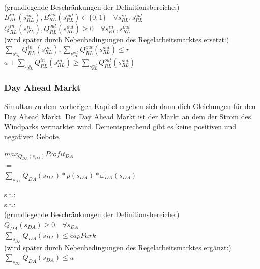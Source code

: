(grundlegende Beschränkungen der Definitionsbereiche:)\\
$B^{in}_{RL}(s^{in}_{RL}),B^{out}_{RL}(s^{out}_{RL}) \in \{0,1\}\quad\forall s^{in}_{RL},s^{out}_{RL} $\\
$Q^{in}_{RL}(s^{in}_{RL}),Q^{out}_{RL}(s^{out}_{RL}) \geq 0\quad\forall  s^{in}_{RL},s^{out}_{RL} $\\
(wird später durch Nebenbedingungen des Regelarbeitsmarktes ersetzt:)\\
$\sum_{s^{in}_{RL}}Q^{in}_{RL}(s^{in}_{RL}),\sum_{s^{out}_{RL}}Q^{out}_{RL}(s^{out}_{RL}) \leq r$\\
$a + \sum_{s^{in}_{RL}}Q^{in}_{RL}(s^{in}_{RL})\geq \sum_{s^{out}_{RL}}Q^{out}_{RL}(s^{out}_{RL}) $\\

\subsubsection{Day Ahead Markt}
Simultan zu dem vorherigen Kapitel ergeben sich dann dich Gleichungen für den Day Ahead Markt.
Der Day Ahead Markt ist der Markt an dem der Strom des Windparks vermarktet wird. Dementsprechend gibt es keine positiven und negativen Gebote.

\begin{center}
	$max_{Q_{DA}(s_{DA})} Profit_{DA}$\\
	$=$\\
	$\sum_{s_{DA}} Q_{DA}(s_{DA}) * p(s_{DA}) * \omega_{DA}(s_{DA})$\\

\end{center}
s.t.:\\

s.t.:\\
(grundlegende Beschränkungen der Definitionsbereiche:)\\
$Q_{DA}(s_{DA}) \geq 0\quad\forall  s_{DA} $\\
$ \sum_{s_{DA}}Q_{DA}(s_{DA}) \leq capPark $\\
(wird später durch Nebenbedingungen des Regelarbeitsmarktes ergänzt:)\\
$ \sum_{s_{DA}}Q_{DA}(s_{DA})\leq a  $\\



